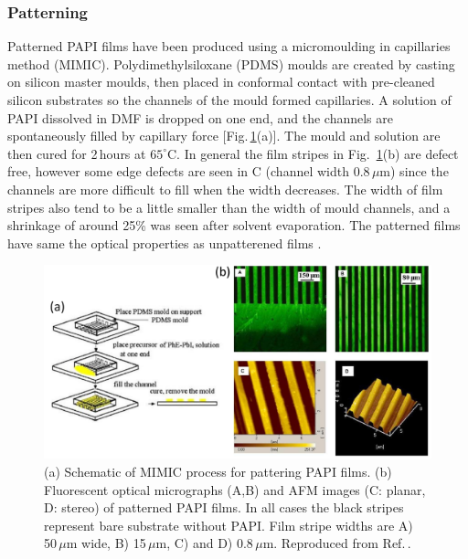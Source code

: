 \subsubsection{Patterning}
Patterned PAPI films have been produced using a micromoulding in capillaries method (MIMIC). Polydimethylsiloxane (PDMS) moulds are created by casting on silicon master moulds, then placed in conformal contact with pre-cleaned silicon substrates so the channels of the mould formed capillaries. A solution of PAPI dissolved in DMF is dropped on one end, and the channels are spontaneously filled by capillary force [Fig.\,\ref{2Fig11}(a)]. The mould and solution are then cured for 2\,hours at $65^{\circ}$C. In general the film stripes in Fig.\ \ref{2Fig11}(b) are defect free, however some edge defects are seen in C (channel width 0.8\,$\mu$m) since the channels are more difficult to fill when the width decreases. The width of film stripes also tend to be a little smaller than the width of mould channels, and a shrinkage of around 25\% was seen after solvent evaporation.  The patterned films have same the optical properties as unpatterened films \cite{Cheng2003}.
\begin{figure} [h!]
\centering
\includegraphics[width=\textwidth]{Fig11}
\caption{(a) Schematic of MIMIC process for pattering PAPI films. (b) Fluorescent optical micrographs (A,B) and AFM images (C: planar, D: stereo) of patterned PAPI films. In all cases the black stripes represent bare substrate without PAPI. Film stripe widths are A) 50\,$\mu$m wide, B) 15\,$\mu$m, C) and D) 0.8\,$\mu$m. Reproduced from Ref.\,\cite{Cheng2003}.}
\label{2Fig11}
\end{figure}


